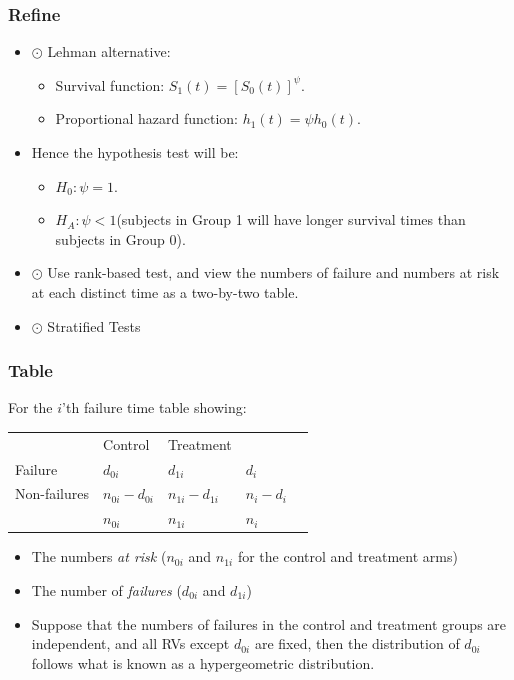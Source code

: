 \documentclass{beamer}
\newcommand{\empr}[1]{{\emph{\color{red}#1}}}
\begin{document}
\pagebreak
\begin{frame}
\frametitle{Refine}
\begin{itemize}
\item {\color{orange}$\odot$} {\color{red}Lehman alternative}:
\begin{itemize}
\item Survival function: $S_1(t) = [S_0(t)]^{\psi}$.
\item Proportional hazard function: $h_1(t)={\psi}h_0(t)$.
\end{itemize}
\item Hence the hypothesis test will be:
\begin{itemize}
\item $H_0:\psi = 1$.
\item $H_A:\psi < 1$(subjects in Group 1 will have longer survival times than subjects in Group 0).
\end{itemize}
\item {\color{blue}$\odot$} Use rank-based test, and view the numbers of failure and numbers at risk at {\color{red}each distinct time} as a two-by-two table.
\item {\color{purple}$\odot$} Stratified Tests
\end{itemize}
\end{frame}

\pagebreak
\begin{frame}
\frametitle{Table}
For the {\color{red}$i$'th failure time} table showing: 
\begin{table}[]
	\begin{tabular}{lllll}
		& Control                      & Treatment                    &       &  \\ \cline{2-3}
		\multicolumn{1}{l|}{Failure}      & \multicolumn{1}{l|}{$d_{0i}$}     & \multicolumn{1}{l|}{$d_{1i}$}     & $d_i$    &  \\ \cline{2-3}
		\multicolumn{1}{l|}{Non-failures} & \multicolumn{1}{l|}{$n_{0i}-d_{0i}$} & \multicolumn{1}{l|}{$n_{1i}-d_{1i}$} & $n_i-d_i$ &  \\ \cline{2-3}
		& $n_{0i}$                          & $n_{1i}$                         & $n_i$    & 
	\end{tabular}
\end{table}
\begin{itemize}
	\item The numbers \empr{at risk} ($n_{0i}$ and $n_{1i}$ for the {\color{red}control} and {\color{red}treatment} arms)
	\item The number of \empr{failures} ($d_{0i}$ and $d_{1i}$)
\end{itemize}
\begin{itemize}
\item Suppose that the numbers of failures in the control and treatment groups are independent, and all RVs except $d_{0i}$ are fixed, then the distribution of $d_{0i}$ follows what is known as a {\color{red}hypergeometric distribution}.
\end{itemize}
\end{frame}
\end{document}
